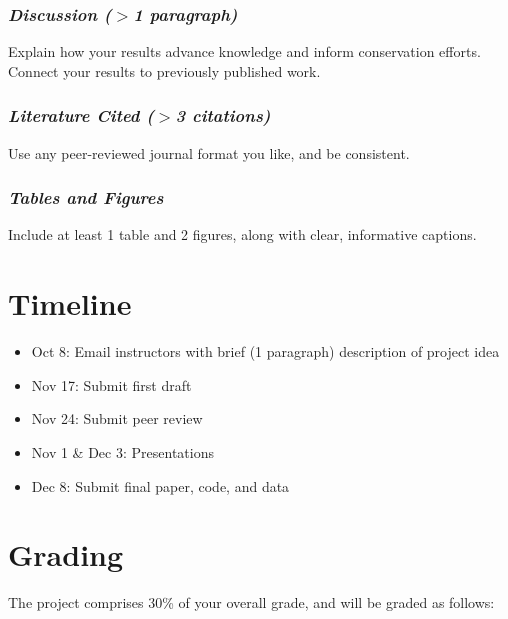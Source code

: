 \documentclass[12pt]{article}
\begin{document}
\subsubsection*{\it Discussion \normalfont ($>$1 paragraph)}
\vspace{-6pt}
Explain how your results advance knowledge and inform conservation
efforts. Connect your results to previously published work.

\subsubsection*{\it Literature Cited \normalfont ($>$3 citations)}
\vspace{-6pt}
Use any peer-reviewed journal format you like, and be consistent.

\subsubsection*{\it Tables and Figures}
\vspace{-6pt}
Include at least 1 table and 2 figures, along with
clear, informative captions. 


\section*{Timeline}

\begin{itemize}
  \item Oct 8: Email instructors with brief (1 paragraph) description
    of project idea
  \item Nov 17: Submit first draft
  \item Nov 24: Submit peer review
  \item Nov 1 \& Dec 3: Presentations
  \item Dec 8: Submit final paper, code, and data
\end{itemize}


\section*{Grading}

The project comprises 30\% of your overall grade, and will be graded as follows:
\end{document}
